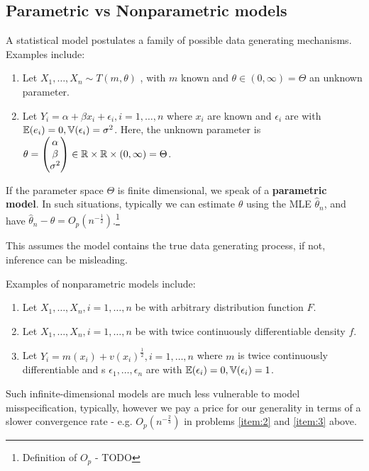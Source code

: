 \subsection{Parametric vs Nonparametric models}
\label{sec:param-vs-nonp}

A statistical model postulates a family of possible data generating
mechanisms.  Examples include:
\begin{enumerate}
\item Let $X_{1}, \dots, X_{n} \sim T(m, \theta)$ \iid, with $m$ known
  and $\theta \in (0, \infty) = \Theta$ an unknown parameter.
\item Let $Y_{i} = \alpha + \beta x_{i}+ \epsilon_{i}, i = 1, \dots,
  n$ where $x_{i}$ are known and $\epsilon_{i}$ are \iid with
  $\E{e_{i}} = 0, \Var{\epsilon_{i}} = \sigma^{2}$.  Here, the unknown
  parameter is $\theta =
  \begin{pmatrix}
    \alpha \\
    \beta \\
    \sigma^{2}
  \end{pmatrix} \in \mathbb{R} \times \mathbb{R} \times (0, \infty) = \Theta$.
\end{enumerate}

If the parameter space $\Theta$ is finite dimensional, we speak of a
\textbf{parametric model}.  In such situations, typically we can
estimate $\theta$ using the MLE $\hat \theta_{n}$, and have $\hat
\theta_{n} - \theta = O_{p}(n^{-\frac{1}{2}})$.\footnote{Definition of
  $O_{p}$ - TODO}

This assumes the model contains the true data generating process, if
not, inference can be misleading.

Examples of nonparametric models include:
\begin{enumerate}
\item \label{item:1} Let $X_{1}, \dots, X_{n}, i = 1, \dots, n$ be
  \iid with arbitrary distribution function $F$.
\item \label{item:2} Let $X_{1}, \dots, X_{n}, i = 1, \dots, n$ be
  \iid with twice continuously differentiable density $f$.
\item \label{item:3} Let $Y_{i} = m(x_{i}) + v(x_{i})^{\frac{1}{2}}, i
  = 1, \dots, n$ where $m$ is twice continuously differentiable and
s  $\epsilon_{1}, \dots, \epsilon_{n}$ are \iid with $\E{\epsilon_{i}}
  = 0, \Var{\epsilon_{i}} = 1$.
\end{enumerate}

Such infinite-dimensional models are much less vulnerable to model
misspecification, typically, however we pay a price for our generality
in terms of a slower convergence rate - e.g. $O_{p}(n^{-\frac{2}{3}})$
in problems \ref{item:2} and \ref{item:3} above.

